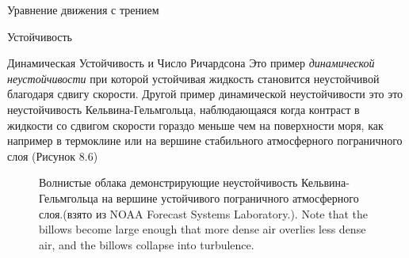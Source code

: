 \begin{chapter}{Уравнение движения с трением}
\begin{section}{Устойчивость}
\begin{paragraph}{Динамическая Устойчивость и Число Ричардсона}
Это пример \emph{динамической неустойчивости} при которой устойчивая
жидкость становится неустойчивой благодаря сдвигу скорости. Другой
пример динамической неустойчивости это это неустойчивость
Кельвина-Гельмгольца, наблюдающаяся когда контраст в жидкости со
сдвигом скорости гораздо меньше чем на поверхности моря, как например
в термоклине или на вершине стабильного атмосферного пограничного слоя
(Рисунок 8.6)
%

\begin{figure}[t!]
\caption{Волнистые облака демонстрирующие неустойчивость
Кельвина-Гельмгольца на вершине устойчивого пограничного атмосферного
слоя.(взято из NOAA Forecast Systems Laboratory.). Note that the
billows become large enough that more dense air overlies less dense
air, and the billows collapse into turbulence.}
\label{fig:helmholtz}
\end{figure}
%


\end{paragraph}
\end{section}
\end{chapter}
